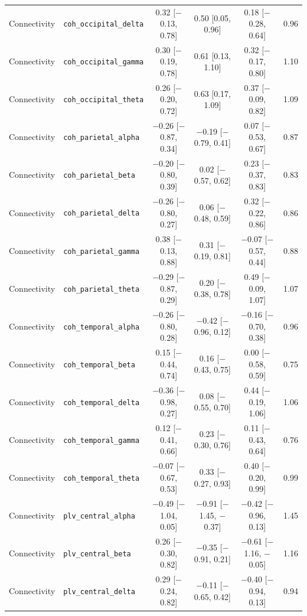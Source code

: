 {\begin{longtable}{llcccc}
Connectivity & \texttt{coh\_occipital\_delta} & 0.32 [$-$0.13, 0.78] & 0.50 [0.05, 0.96] & 0.18 [$-$0.28, 0.64] & 0.96 \\
Connectivity & \texttt{coh\_occipital\_gamma} & 0.30 [$-$0.19, 0.78] & 0.61 [0.13, 1.10] & 0.32 [$-$0.17, 0.80] & 1.10 \\
Connectivity & \texttt{coh\_occipital\_theta} & 0.26 [$-$0.20, 0.72] & 0.63 [0.17, 1.09] & 0.37 [$-$0.09, 0.82] & 1.09 \\
Connectivity & \texttt{coh\_parietal\_alpha} & $-$0.26 [$-$0.87, 0.34] & $-$0.19 [$-$0.79, 0.41] & 0.07 [$-$0.53, 0.67] & 0.87 \\
Connectivity & \texttt{coh\_parietal\_beta} & $-$0.20 [$-$0.80, 0.39] & 0.02 [$-$0.57, 0.62] & 0.23 [$-$0.37, 0.83] & 0.83 \\
Connectivity & \texttt{coh\_parietal\_delta} & $-$0.26 [$-$0.80, 0.27] & 0.06 [$-$0.48, 0.59] & 0.32 [$-$0.22, 0.86] & 0.86 \\
Connectivity & \texttt{coh\_parietal\_gamma} & 0.38 [$-$0.13, 0.88] & 0.31 [$-$0.19, 0.81] & $-$0.07 [$-$0.57, 0.44] & 0.88 \\
Connectivity & \texttt{coh\_parietal\_theta} & $-$0.29 [$-$0.87, 0.29] & 0.20 [$-$0.38, 0.78] & 0.49 [$-$0.09, 1.07] & 1.07 \\
Connectivity & \texttt{coh\_temporal\_alpha} & $-$0.26 [$-$0.80, 0.28] & $-$0.42 [$-$0.96, 0.12] & $-$0.16 [$-$0.70, 0.38] & 0.96 \\
Connectivity & \texttt{coh\_temporal\_beta} & 0.15 [$-$0.44, 0.74] & 0.16 [$-$0.43, 0.75] & 0.00 [$-$0.58, 0.59] & 0.75 \\
Connectivity & \texttt{coh\_temporal\_delta} & $-$0.36 [$-$0.98, 0.27] & 0.08 [$-$0.55, 0.70] & 0.44 [$-$0.19, 1.06] & 1.06 \\
Connectivity & \texttt{coh\_temporal\_gamma} & 0.12 [$-$0.41, 0.66] & 0.23 [$-$0.30, 0.76] & 0.11 [$-$0.43, 0.64] & 0.76 \\
Connectivity & \texttt{coh\_temporal\_theta} & $-$0.07 [$-$0.67, 0.53] & 0.33 [$-$0.27, 0.93] & 0.40 [$-$0.20, 0.99] & 0.99 \\
Connectivity & \texttt{plv\_central\_alpha} & $-$0.49 [$-$1.04, 0.05] & $-$0.91 [$-$1.45, $-$0.37] & $-$0.42 [$-$0.96, 0.13] & 1.45 \\
Connectivity & \texttt{plv\_central\_beta} & 0.26 [$-$0.30, 0.82] & $-$0.35 [$-$0.91, 0.21] & $-$0.61 [$-$1.16, $-$0.05] & 1.16 \\
Connectivity & \texttt{plv\_central\_delta} & 0.29 [$-$0.24, 0.82] & $-$0.11 [$-$0.65, 0.42] & $-$0.40 [$-$0.94, 0.13] & 0.94 \\

\end{longtable}}
